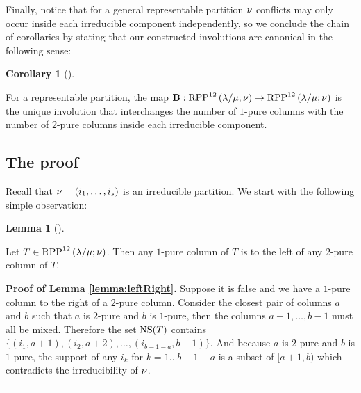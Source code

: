 \documentclass[numbers=enddot,12pt,final,onecolumn,notitlepage]{scrartcl}%
\theoremstyle{definition}
\newtheorem{lem}[theo]{Lemma}
\newenvironment{lemma}[1][]
{\begin{lem}[#1]\begin{leftbar}}
{\end{leftbar}\end{lem}}
\newtheorem{coro}[theo]{Corollary}
\newenvironment{corollary}[1][]
{\begin{coro}[#1]\begin{leftbar}}
{\end{leftbar}\end{coro}}
\newenvironment{proof}[1][Proof]{\noindent\textbf{#1.} }{\ \rule{0.5em}{0.5em}}
\begin{document}
Finally, notice that for a general representable partition ${{\nu}}$ conflicts may only occur inside each irreducible component independently, so we conclude the chain of corollaries by stating that our constructed involutions are canonical in the following sense:

\begin{corollary}
 For a representable partition, the map $\mathbf{B}:{\operatorname*{RPP}^{12}\left( \lambda/\mu ;{{\nu}} \right)}\to{\operatorname*{RPP}^{12}\left( \lambda/\mu ;{{\nu}}\right)}$ is the unique involution that interchanges the number of $1$-pure columns with the number of $2$-pure columns inside each irreducible component.
\end{corollary}

\subsection{The proof}
Recall that ${{\nu}}=(i_1,\dots,i_s)$ is an irreducible partition. We start with the following simple observation:
\begin{lemma}
\label{lemma:leftRight}
 Let $T\in{\operatorname*{RPP}^{12}\left( \lambda/\mu ;{{\nu}}\right)}$. Then any $1$-pure column of $T$ is to the left of any $2$-pure column of $T$.
\end{lemma}
\begin{proof}[Proof of Lemma \ref{lemma:leftRight}]
Suppose it is false and we have a $1$-pure column to the right of a $2$-pure column. Consider the closest pair of columns $a$ and $b$ such that $a$ is $2$-pure and $b$ is $1$-pure, then the columns $a+1,\dots,b-1$ must all be mixed. %
Therefore the set ${\operatorname*{NS}}(T)$ contains $\{(i_1,a+1),(i_2,a+2),\dots,(i_{b-1-a},b-1)\}$. And because $a$ is $2$-pure and $b$ is $1$-pure, the support of any $i_k$ for $k=1\dots b-1-a$ is a subset of $[a+1,b)$ which contradicts the irreducibility of ${{\nu}}$.
\end{proof}
\end{document}
